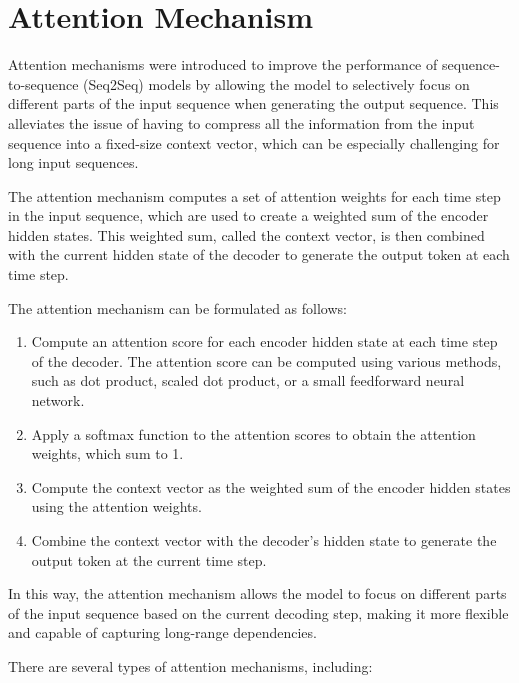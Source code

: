 \documentclass[12pt]{article}
\begin{document}
\section{Attention Mechanism}

Attention mechanisms were introduced to improve the performance of sequence-to-sequence (Seq2Seq) models by allowing the model to selectively focus on different parts of the input sequence when generating the output sequence. This alleviates the issue of having to compress all the information from the input sequence into a fixed-size context vector, which can be especially challenging for long input sequences.

The attention mechanism computes a set of attention weights for each time step in the input sequence, which are used to create a weighted sum of the encoder hidden states. This weighted sum, called the context vector, is then combined with the current hidden state of the decoder to generate the output token at each time step.

The attention mechanism can be formulated as follows:

\begin{enumerate}
	\item Compute an attention score for each encoder hidden state at each time step of the decoder. The attention score can be computed using various methods, such as dot product, scaled dot product, or a small feedforward neural network.
	\item Apply a softmax function to the attention scores to obtain the attention weights, which sum to 1.
	\item Compute the context vector as the weighted sum of the encoder hidden states using the attention weights.
	\item Combine the context vector with the decoder's hidden state to generate the output token at the current time step.
\end{enumerate}
In this way, the attention mechanism allows the model to focus on different parts of the input sequence based on the current decoding step, making it more flexible and capable of capturing long-range dependencies.

There are several types of attention mechanisms, including:
\end{document}
